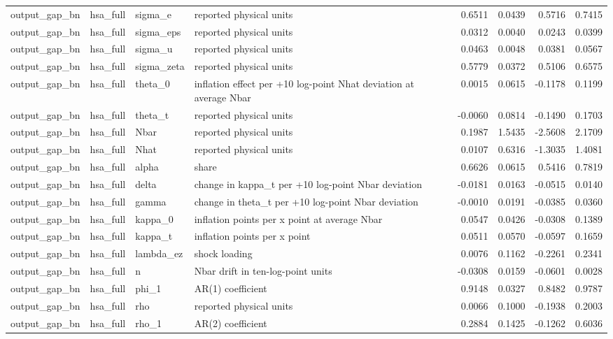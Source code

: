 \begin{tabular}{llllrrrr}
output\_gap\_bn & hsa\_full & sigma\_e & reported physical units & 0.6511 & 0.0439 & 0.5716 & 0.7415 \\
output\_gap\_bn & hsa\_full & sigma\_eps & reported physical units & 0.0312 & 0.0040 & 0.0243 & 0.0399 \\
output\_gap\_bn & hsa\_full & sigma\_u & reported physical units & 0.0463 & 0.0048 & 0.0381 & 0.0567 \\
output\_gap\_bn & hsa\_full & sigma\_zeta & reported physical units & 0.5779 & 0.0372 & 0.5106 & 0.6575 \\
output\_gap\_bn & hsa\_full & theta\_0 & inflation effect per +10 log-point Nhat deviation at average Nbar & 0.0015 & 0.0615 & -0.1178 & 0.1199 \\
output\_gap\_bn & hsa\_full & theta\_t & reported physical units & -0.0060 & 0.0814 & -0.1490 & 0.1703 \\
output\_gap\_bn & hsa\_full & Nbar & reported physical units & 0.1987 & 1.5435 & -2.5608 & 2.1709 \\
output\_gap\_bn & hsa\_full & Nhat & reported physical units & 0.0107 & 0.6316 & -1.3035 & 1.4081 \\
output\_gap\_bn & hsa\_full & alpha & share & 0.6626 & 0.0615 & 0.5416 & 0.7819 \\
output\_gap\_bn & hsa\_full & delta & change in kappa\_t per +10 log-point Nbar deviation & -0.0181 & 0.0163 & -0.0515 & 0.0140 \\
output\_gap\_bn & hsa\_full & gamma & change in theta\_t per +10 log-point Nbar deviation & -0.0010 & 0.0191 & -0.0385 & 0.0360 \\
output\_gap\_bn & hsa\_full & kappa\_0 & inflation points per x point at average Nbar & 0.0547 & 0.0426 & -0.0308 & 0.1389 \\
output\_gap\_bn & hsa\_full & kappa\_t & inflation points per x point & 0.0511 & 0.0570 & -0.0597 & 0.1659 \\
output\_gap\_bn & hsa\_full & lambda\_ez & shock loading & 0.0076 & 0.1162 & -0.2261 & 0.2341 \\
output\_gap\_bn & hsa\_full & n & Nbar drift in ten-log-point units & -0.0308 & 0.0159 & -0.0601 & 0.0028 \\
output\_gap\_bn & hsa\_full & phi\_1 & AR(1) coefficient & 0.9148 & 0.0327 & 0.8482 & 0.9787 \\
output\_gap\_bn & hsa\_full & rho & reported physical units & 0.0066 & 0.1000 & -0.1938 & 0.2003 \\
output\_gap\_bn & hsa\_full & rho\_1 & AR(2) coefficient & 0.2884 & 0.1425 & -0.1262 & 0.6036 \\

\end{tabular}
